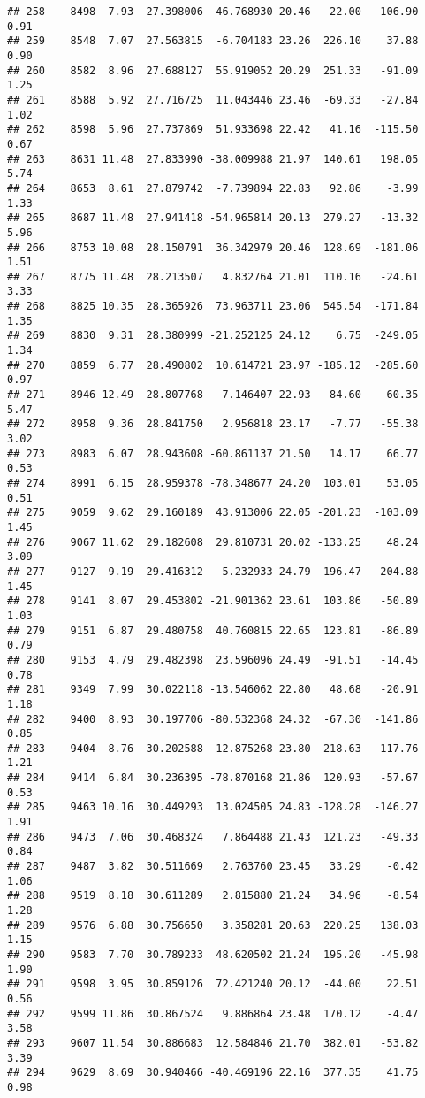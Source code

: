 \documentclass[]{article}
\begin{document}
\begin{verbatim}
## 258    8498  7.93  27.398006 -46.768930 20.46   22.00   106.90  0.91
## 259    8548  7.07  27.563815  -6.704183 23.26  226.10    37.88  0.90
## 260    8582  8.96  27.688127  55.919052 20.29  251.33   -91.09  1.25
## 261    8588  5.92  27.716725  11.043446 23.46  -69.33   -27.84  1.02
## 262    8598  5.96  27.737869  51.933698 22.42   41.16  -115.50  0.67
## 263    8631 11.48  27.833990 -38.009988 21.97  140.61   198.05  5.74
## 264    8653  8.61  27.879742  -7.739894 22.83   92.86    -3.99  1.33
## 265    8687 11.48  27.941418 -54.965814 20.13  279.27   -13.32  5.96
## 266    8753 10.08  28.150791  36.342979 20.46  128.69  -181.06  1.51
## 267    8775 11.48  28.213507   4.832764 21.01  110.16   -24.61  3.33
## 268    8825 10.35  28.365926  73.963711 23.06  545.54  -171.84  1.35
## 269    8830  9.31  28.380999 -21.252125 24.12    6.75  -249.05  1.34
## 270    8859  6.77  28.490802  10.614721 23.97 -185.12  -285.60  0.97
## 271    8946 12.49  28.807768   7.146407 22.93   84.60   -60.35  5.47
## 272    8958  9.36  28.841750   2.956818 23.17   -7.77   -55.38  3.02
## 273    8983  6.07  28.943608 -60.861137 21.50   14.17    66.77  0.53
## 274    8991  6.15  28.959378 -78.348677 24.20  103.01    53.05  0.51
## 275    9059  9.62  29.160189  43.913006 22.05 -201.23  -103.09  1.45
## 276    9067 11.62  29.182608  29.810731 20.02 -133.25    48.24  3.09
## 277    9127  9.19  29.416312  -5.232933 24.79  196.47  -204.88  1.45
## 278    9141  8.07  29.453802 -21.901362 23.61  103.86   -50.89  1.03
## 279    9151  6.87  29.480758  40.760815 22.65  123.81   -86.89  0.79
## 280    9153  4.79  29.482398  23.596096 24.49  -91.51   -14.45  0.78
## 281    9349  7.99  30.022118 -13.546062 22.80   48.68   -20.91  1.18
## 282    9400  8.93  30.197706 -80.532368 24.32  -67.30  -141.86  0.85
## 283    9404  8.76  30.202588 -12.875268 23.80  218.63   117.76  1.21
## 284    9414  6.84  30.236395 -78.870168 21.86  120.93   -57.67  0.53
## 285    9463 10.16  30.449293  13.024505 24.83 -128.28  -146.27  1.91
## 286    9473  7.06  30.468324   7.864488 21.43  121.23   -49.33  0.84
## 287    9487  3.82  30.511669   2.763760 23.45   33.29    -0.42  1.06
## 288    9519  8.18  30.611289   2.815880 21.24   34.96    -8.54  1.28
## 289    9576  6.88  30.756650   3.358281 20.63  220.25   138.03  1.15
## 290    9583  7.70  30.789233  48.620502 21.24  195.20   -45.98  1.90
## 291    9598  3.95  30.859126  72.421240 20.12  -44.00    22.51  0.56
## 292    9599 11.86  30.867524   9.886864 23.48  170.12    -4.47  3.58
## 293    9607 11.54  30.886683  12.584846 21.70  382.01   -53.82  3.39
## 294    9629  8.69  30.940466 -40.469196 22.16  377.35    41.75  0.98

\end{verbatim}
\end{document}
